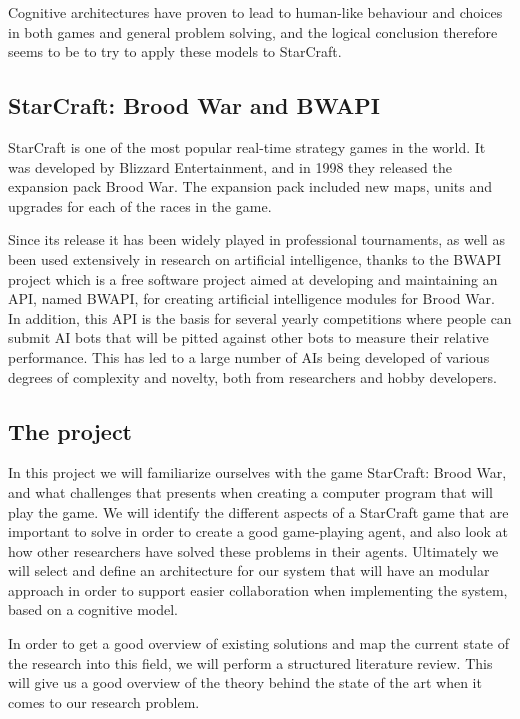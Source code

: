 Cognitive architectures have proven to lead to human-like behaviour and choices
in both games\cite{arrabales2009gamechars} and general problem
solving\cite{franklin2003interacting}, and the logical conclusion therefore
seems to be to try to apply these models to StarCraft.

\subsection{StarCraft: Brood War and BWAPI}
StarCraft is one of the most popular real-time strategy games in the world. It
was developed by Blizzard Entertainment, and in 1998 they released the expansion
pack Brood War. The expansion pack included new maps, units and upgrades for
each of the races in the game.
 
Since its release it has been widely played in professional tournaments, as well
as been used extensively in research on artificial intelligence, thanks to the
BWAPI project which is a free software project aimed at developing and
maintaining an API, named BWAPI, for creating artificial intelligence modules
for Brood War. In addition, this API is the basis for several yearly
competitions where people can submit AI bots that will be pitted against other
bots to measure their relative performance. This has led to a large number of
AIs being developed of various degrees of complexity and novelty, both from
researchers and hobby developers. 

\subsection{The project}
In this project we will familiarize ourselves with the game StarCraft: Brood
War, and what challenges that presents when creating a computer program that
will play the game. We will identify the different aspects of a StarCraft game
that are important to solve in order to create a good game-playing agent, and
also look at how other researchers have solved these problems in their agents.
Ultimately we will select and define an architecture for our system that will
have an modular approach in order to support easier collaboration when
implementing the system, based on a cognitive model.

In order to get a good overview of existing solutions and map the current state
of the research into this field, we will perform a structured literature review.
This will give us a good overview of the theory behind the state of the art
when it comes to our research problem.

